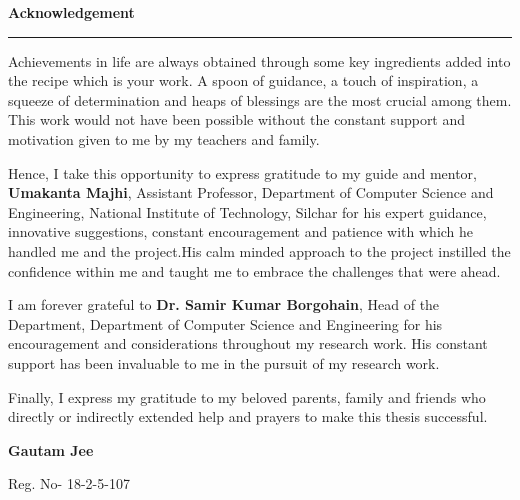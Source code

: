 \setlength{\headsep}{0.4in}
\vspace*{5cm}
\begin{center}

{\bf \LARGE Acknowledgement}

\end{center}

{\noindent \rule{\linewidth}{1mm}} \vspace{0.25in}

\par
Achievements in life are always obtained through some key ingredients added into the recipe which is your work. A spoon of guidance, a touch of inspiration, a squeeze of determination and heaps of blessings are the most crucial among them. This work would not have been possible without the constant support and motivation given to me by my teachers and family.

Hence, I take this opportunity to express gratitude to my guide and mentor, \textbf{Umakanta Majhi}, Assistant Professor, Department of Computer Science and Engineering, National Institute of Technology, Silchar for his expert guidance, innovative suggestions, constant encouragement and patience with which he handled me and the project.His calm minded approach to the project instilled the confidence within me and taught me to embrace the challenges that were ahead.

I am forever grateful to \textbf{Dr. Samir Kumar Borgohain}, Head of the Department, Department of Computer Science and Engineering for his encouragement and considerations throughout my research work. His constant support has been invaluable to me in the pursuit of my research work.

Finally, I express my gratitude to my beloved parents, family and friends who directly or indirectly extended help and prayers to make this thesis successful. 


\vspace{1.5cm}

\begin{flushright}

\textbf{Gautam Jee}

Reg. No- 18-2-5-107
\end{flushright}
\pagebreak

